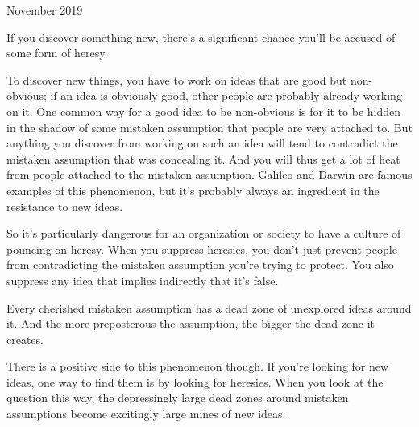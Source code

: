 November 2019

If you discover something new, there's a significant chance you'll be
accused of some form of heresy.

To discover new things, you have to work on ideas that are good but
non-obvious; if an idea is obviously good, other people are probably
already working on it. One common way for a good idea to be non-obvious
is for it to be hidden in the shadow of some mistaken assumption that
people are very attached to. But anything you discover from working on
such an idea will tend to contradict the mistaken assumption that was
concealing it. And you will thus get a lot of heat from people attached
to the mistaken assumption. Galileo and Darwin are famous examples of
this phenomenon, but it's probably always an ingredient in the
resistance to new ideas.

So it's particularly dangerous for an organization or society to have a
culture of pouncing on heresy. When you suppress heresies, you don't
just prevent people from contradicting the mistaken assumption you're
trying to protect. You also suppress any idea that implies indirectly
that it's false.

Every cherished mistaken assumption has a dead zone of unexplored ideas
around it. And the more preposterous the assumption, the bigger the dead
zone it creates.

There is a positive side to this phenomenon though. If you're looking
for new ideas, one way to find them is by \href{say.html}{looking for
heresies}. When you look at the question this way, the depressingly
large dead zones around mistaken assumptions become excitingly large
mines of new ideas.
